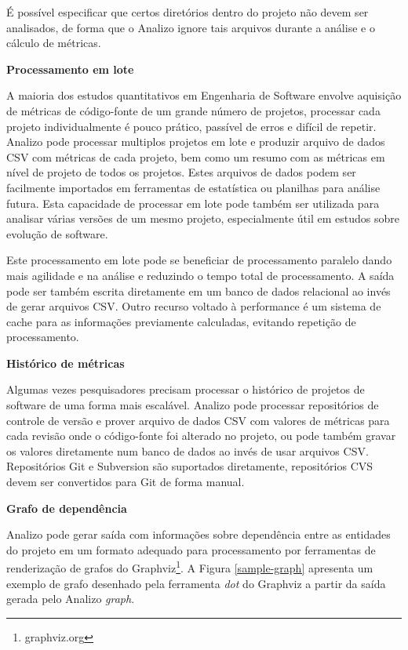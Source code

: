 É possível especificar que certos diretórios dentro do projeto não devem ser
analisados, de forma que o Analizo ignore tais arquivos durante a análise e o
cálculo de métricas.

{\bf Processamento em lote}\label{lote}

A maioria dos estudos quantitativos em Engenharia de Software envolve aquisição
de métricas de código-fonte de um grande número de projetos, processar cada
projeto individualmente é pouco prático, passível de erros e difícil de
repetir. Analizo pode processar multiplos projetos em lote e produzir arquivo
de dados CSV com métricas de cada projeto, bem como um resumo com as métricas
em nível de projeto de todos os projetos. Estes arquivos de dados podem ser
facilmente importados em ferramentas de estatística ou planilhas para análise
futura. Esta capacidade de processar em lote pode também ser utilizada para
analisar várias versões de um mesmo projeto, especialmente útil em estudos
sobre evolução de software.

Este processamento em lote pode se beneficiar de processamento paralelo dando
mais agilidade e na análise e reduzindo o tempo total de processamento.  A
saída pode ser também escrita diretamente em um banco de dados relacional ao
invés de gerar arquivos CSV. Outro recurso voltado à performance é um sistema
de cache para as informações previamente calculadas, evitando repetição de
processamento.

{\bf Histórico de métricas}

Algumas vezes pesquisadores precisam processar o histórico de projetos de
software de uma forma mais escalável. Analizo pode processar repositórios de
controle de versão e prover arquivo de dados CSV com valores de métricas para
cada revisão onde o código-fonte foi alterado no projeto, ou pode também gravar
os valores diretamente num banco de dados ao invés de usar arquivos CSV. Repositórios Git e
Subversion são suportados diretamente, repositórios CVS devem ser convertidos
para Git de forma manual.

{\bf Grafo de dependência}

Analizo pode gerar saída com informações sobre dependência entre as entidades
do projeto em um formato adequado para processamento por ferramentas de
renderização de grafos do Graphviz\footnote{graphviz.org}. A Figura
\ref{sample-graph} apresenta um exemplo de grafo desenhado pela ferramenta {\it
dot} do Graphviz a partir da saída gerada pelo Analizo {\it graph}.

